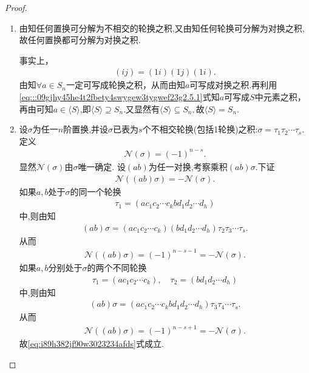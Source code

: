 \documentclass[../../main.tex]{subfiles}%
\begin{document}
\begin{proof}
\begin{enumerate}[(1)]
\item 由知任何置换可分解为不相交的轮换之积,又由知任何轮换可分解为对换之积,故任何置换都可分解为对换之积.

事实上，
\begin{align}
(ij) = (1i)(1j)(1i). \label{eq:::09gjhy45he4t2fbety4swygew3tygwef23g2.5.1}
\end{align}
由知$\forall a \in S_n$一定可写成轮换之积，从而由知$a$可写成对换之积.再利用\eqref{eq:::09gjhy45he4t2fbety4swygew3tygwef23g2.5.1}式知$a$可写成$S$中元素之积，再由可知$a\in \langle S\rangle$,即$\langle S\rangle\supseteq S_n$.又显然有$\langle S\rangle\subseteq S_n,$故$\langle S\rangle=S_n.$

\item 设$\sigma$为任一$n$阶置换,并设$\sigma$已表为$s$个不相交轮换(包括1轮换)之积:$\sigma = \tau_1\tau_2\cdots\tau_s$.
定义
\begin{align*}
\mathcal{N}(\sigma) = (-1)^{n-s}.
\end{align*}
显然$\mathcal{N}(\sigma)$由$\sigma$唯一确定.
设$(ab)$为任一对换,考察乘积$(ab)\sigma.$下证
\begin{align}\label{eq:i89h382jf90w3023234afds}
\mathcal{N}((ab)\sigma)=-\mathcal{N}(\sigma).
\end{align}
如果$a,b$处于$\sigma$的同一个轮换
\begin{align*}
\tau_1 = (a c_1 c_2 \cdots c_k b d_1 d_2 \cdots d_h)
\end{align*}
中,则由知
\begin{align*}
(ab)\sigma = (a c_1 c_2 \cdots c_k)(b d_1 d_2 \cdots d_h)\tau_2\tau_3 \cdots \tau_s.
\end{align*}
从而
\begin{align*}
\mathcal{N}((ab)\sigma) = (-1)^{n-s-1} = -\mathcal{N}(\sigma).
\end{align*}
如果$a,b$分别处于$\sigma$的两个不同轮换
\begin{align*}
\tau_1 = (a c_1 c_2 \cdots c_k),\quad \tau_2 = (b d_1 d_2 \cdots d_h)
\end{align*}
中,则由知
\begin{align*}
(ab)\sigma = (a c_1 c_2 \cdots c_k b d_1 d_2 \cdots d_h)\tau_3\tau_4 \cdots \tau_s.
\end{align*}
从而
\begin{align*}
\mathcal{N}((ab)\sigma) = (-1)^{n-s+1} = -\mathcal{N}(\sigma).
\end{align*}
故\eqref{eq:i89h382jf90w3023234afds}式成立.


\end{enumerate}
\end{proof}
\end{document}

